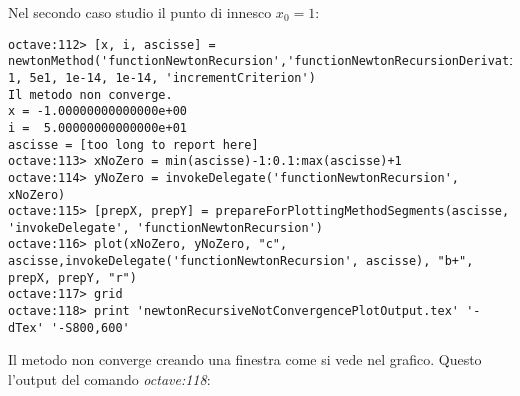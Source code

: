 Nel secondo caso studio il punto di innesco $x_{0} = 1$:
\begin{lstlisting}
octave:112> [x, i, ascisse] =
newtonMethod('functionNewtonRecursion','functionNewtonRecursionDerivative', 1, 5e1, 1e-14, 1e-14, 'incrementCriterion') 
Il metodo non converge.
x = -1.00000000000000e+00
i =  5.00000000000000e+01
ascisse = [too long to report here]
octave:113> xNoZero = min(ascisse)-1:0.1:max(ascisse)+1
octave:114> yNoZero = invokeDelegate('functionNewtonRecursion', xNoZero)
octave:115> [prepX, prepY] = prepareForPlottingMethodSegments(ascisse, 'invokeDelegate', 'functionNewtonRecursion')
octave:116> plot(xNoZero, yNoZero, "c", ascisse,invokeDelegate('functionNewtonRecursion', ascisse), "b+", prepX, prepY, "r")
octave:117> grid
octave:118> print 'newtonRecursiveNotConvergencePlotOutput.tex' '-dTex' '-S800,600'
\end{lstlisting}
Il metodo non converge creando una finestra come si vede nel grafico. Questo
l'output del comando \emph{octave:118}:
\begin{center}

\end{center}